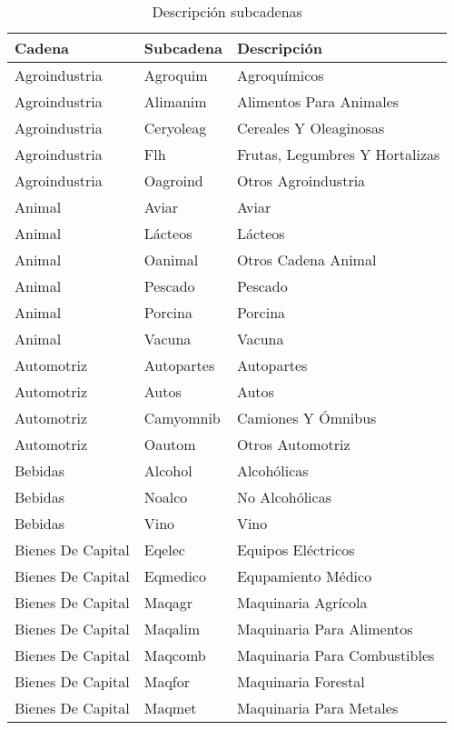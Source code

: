 \documentclass[class=article, crop=false]{standalone}
\begin{document}
\begin{longtable}[!ht]{lll}
	\caption{Descripción subcadenas}
	\label{tabla:subcadenas}
	\endlastfoot
	
	\textbf{Cadena} & \textbf{Subcadena} & \textbf{Descripción} \\
	\endhead
	Agroindustria & Agroquim & Agroquímicos \\
	Agroindustria & Alimanim & Alimentos Para Animales \\
	Agroindustria & Ceryoleag & Cereales Y Oleaginosas \\
	Agroindustria & Flh & Frutas, Legumbres Y Hortalizas \\
	Agroindustria & Oagroind & Otros Agroindustria \\
	Animal & Aviar & Aviar \\
	Animal & Lácteos & Lácteos \\
	Animal & Oanimal & Otros Cadena Animal \\
	Animal & Pescado & Pescado \\
	Animal & Porcina & Porcina \\
	Animal & Vacuna & Vacuna \\
	Automotriz & Autopartes & Autopartes \\
	Automotriz & Autos & Autos \\
	Automotriz & Camyomnib & Camiones Y Ómnibus \\
	Automotriz & Oautom & Otros Automotriz \\
	Bebidas & Alcohol & Alcohólicas \\
	Bebidas & Noalco & No Alcohólicas \\
	Bebidas & Vino & Vino \\
	Bienes De Capital & Eqelec & Equipos Eléctricos \\
	Bienes De Capital & Eqmedico & Equpamiento Médico \\
	Bienes De Capital & Maqagr & Maquinaria Agrícola \\
	Bienes De Capital & Maqalim & Maquinaria Para Alimentos \\
	Bienes De Capital & Maqcomb & Maquinaria Para Combustibles \\
	Bienes De Capital & Maqfor & Maquinaria Forestal \\
	Bienes De Capital & Maqmet & Maquinaria Para Metales \\

\end{longtable}
\end{document}
